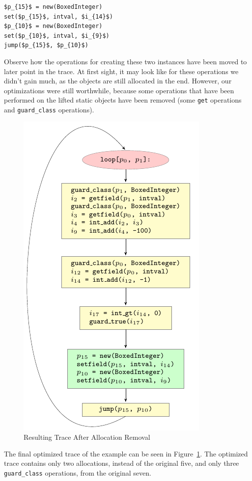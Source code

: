 \documentclass[preprint]{sigplanconf}
\begin{document}
\begin{lstlisting}[mathescape,xleftmargin=20pt]
$p_{15}$ = new(BoxedInteger)
set($p_{15}$, intval, $i_{14}$)
$p_{10}$ = new(BoxedInteger)
set($p_{10}$, intval, $i_{9}$)
jump($p_{15}$, $p_{10}$)
\end{lstlisting}

Observe how the operations for creating these two instances have been moved to later point in the
trace. 
At first sight, it may look like for these operations we didn't gain much, as
the objects are still allocated in the end. However, our optimizations were still
worthwhile, because some operations that have been performed
on the lifted static objects have been removed (some \lstinline{get} operations
and \lstinline{guard_class} operations).

\begin{figure}
\includegraphics{figures/step1.pdf}
\caption{Resulting Trace After Allocation Removal}
\label{fig:step1}
\end{figure}

The final optimized trace of the example can be seen in Figure~\ref{fig:step1}.
The optimized trace contains only two allocations, instead of the original five,
and only three \lstinline{guard_class} operations, from the original seven.
\end{document}
